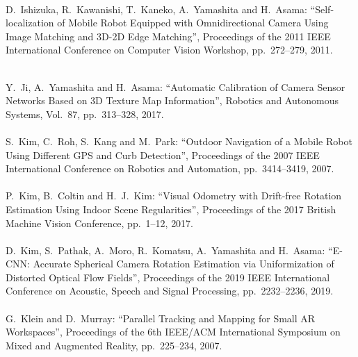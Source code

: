 \begin{mythebibliography}{}

\leavevmode \\D.~Ishizuka, R.~Kawanishi, T.~Kaneko, A.~Yamashita and H.~Asama:
\newblock``Self-localization of Mobile Robot Equipped with Omnidirectional Camera Using Image Matching and 3D-2D Edge Matching'',
\newblock Proceedings of the 2011 IEEE International Conference on Computer Vision Workshop, pp.~272--279, 2011.
\\

\newpage

\leavevmode \\Y.~Ji, A.~Yamashita and H.~Asama:
\newblock``Automatic Calibration of Camera Sensor Networks Based on 3D Texture Map Information'',
\newblock Robotics and Autonomous Systems, Vol.~87, pp.~313--328, 2017.
\\

\leavevmode \\S.~Kim, C.~Roh, S.~Kang and M.~Park:
\newblock ``Outdoor Navigation of a Mobile Robot Using Different GPS and Curb Detection'',
\newblock Proceedings of the 2007 IEEE International Conference on Robotics and Automation, pp.~3414--3419, 2007.
\\

\leavevmode \\P.~Kim, B.~Coltin and H.~J.~Kim:
\newblock ``Visual Odometry with Drift-free Rotation Estimation Using Indoor Scene Regularities'',
\newblock Proceedings of the 2017 British Machine Vision Conference, pp.~1--12, 2017.
\\

\leavevmode \\D.~Kim, S.~Pathak, A.~Moro, R.~Komatsu, A.~Yamashita and H.~Asama:
\newblock ``E-CNN: Accurate Spherical Camera Rotation Estimation via Uniformization of Distorted Optical Flow Fields'',
\newblock Proceedings of the 2019 IEEE International Conference on Acoustic, Speech and Signal Processing, pp.~2232--2236, 2019.
\\

\leavevmode \\G.~Klein and D.~Murray:
\newblock ``Parallel Tracking and Mapping for Small AR Workspaces'',
\newblock Proceedings of the 6th IEEE/ACM International Symposium on Mixed and Augmented Reality, pp.~225--234, 2007.
\\


\end{mythebibliography}
